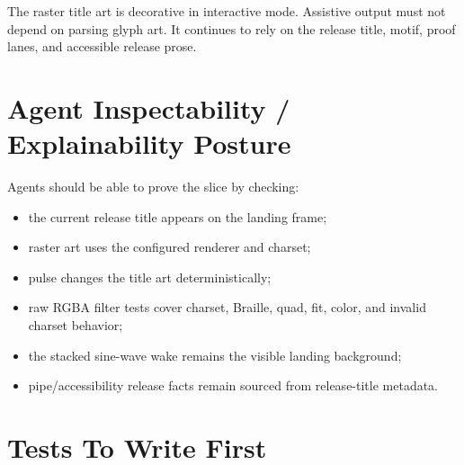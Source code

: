 The raster title art is decorative in interactive mode. Assistive output must not depend on parsing glyph art. It continues to rely on the release title, motif, proof lanes, and accessible release prose.

\section{Agent Inspectability / Explainability Posture}\label{record-113-agent-inspectability-explainability-posture}

Agents should be able to prove the slice by checking:

\begin{itemize}
\tightlist
\item
  the current release title appears on the landing frame;
\item
  raster art uses the configured renderer and charset;
\item
  pulse changes the title art deterministically;
\item
  raw RGBA filter tests cover charset, Braille, quad, fit, color, and invalid charset behavior;
\item
  the stacked sine-wave wake remains the visible landing background;
\item
  pipe/accessibility release facts remain sourced from release-title metadata.
\end{itemize}

\section{Tests To Write First}\label{record-113-tests-to-write-first}

